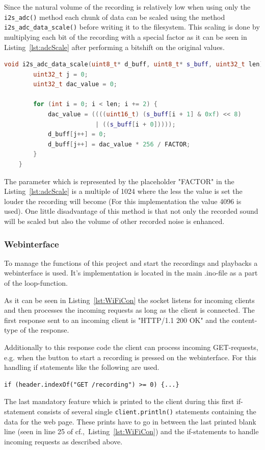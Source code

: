 Since the natural volume of the recording is relatively low when using only the \texttt{i2s\_adc()} method each chunk of data can be scaled using the method \texttt{i2s\_adc\_data\_scale()} before writing it to the filesystem.
This scaling is done by multiplying each bit of the recording with a special factor as it can be seen in Listing~\ref{lst:adcScale} after performing a bitshift on the original values.
\begin{lstlisting}[frame=single, language={c++}, style=style,
	caption={The function which is used to scale the captured recordings volume.}, label={lst:adcScale},float=!htb]	
	void i2s_adc_data_scale(uint8_t* d_buff, uint8_t* s_buff, uint32_t len) {
		uint32_t j = 0;
		uint32_t dac_value = 0;
		
		for (int i = 0; i < len; i += 2) {
			dac_value = ((((uint16_t) (s_buff[i + 1] & 0xf) << 8)
						 | ((s_buff[i + 0]))));
			d_buff[j++] = 0;
			d_buff[j++] = dac_value * 256 / FACTOR;
		}
	}	
\end{lstlisting}
The parameter which is represented by the placeholder "FACTOR" in the Listing~\ref{lst:adcScale} is a multiple of 1024 where the less the value is set the louder the recording will become (For this implementation the value 4096 is used).
One little disadvantage of this method is that not only the recorded sound will be scaled but also the volume of other recorded noise is enhanced.

\subsubsection{Webinterface}
To manage the functions of this project and start the recordings and playbacks a webinterface is used.
It's implementation is located in the main .ino-file as a part of the loop-function.

As it can be seen in Listing~\ref{lst:WiFiCon} the socket listens for incoming clients and then processes the incoming requests as long as the client is connected.
The first response sent to an incoming client is "HTTP/1.1 200 OK" and the content-type of the response.

Additionally to this response code the client can process incoming GET-requests, e.g. when the button to start a recording is pressed on the webinterface.
For this handling if statements like the following are used.
\begin{lstlisting}[style=inText] 
	if (header.indexOf("GET /recording") >= 0) {...}  
\end{lstlisting}
The last mandatory feature which is printed to the client during this first if-statement consists of several single \texttt{client.println()} statements containing the data for the web page.
These prints have to go in between the last printed blank line (seen in line 25 of cf.,~Listing~\ref{lst:WiFiCon}) and the if-statements to handle incoming requests as described above.

